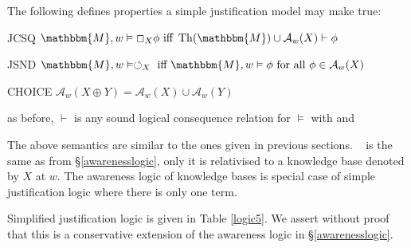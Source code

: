 \begin{definition}
  The following defines properties a simple justification model may make true:
  
  \begin{descriptiondash}
    \item[JCSQ] $\mathbbm{M}, w \vDash \Box_X \phi \text{ iff } \tmop{Th}
    (\mathbbm{M}) \cup \mathcal{A}_w (X) \vdash \phi$
    
    \item[JSND] $\mathbbm{M}, w \vDash \circlearrowleft_X \text{ iff
    $\mathbbm{M}, w \vDash \phi$ for all $\phi \in \mathcal{A}_w (X)$}$
    
    \item[CHOICE] $\mathcal{A}_w (X \oplus Y) = \mathcal{A}_w (X) \cup
    \mathcal{A}_w (Y)$
  \end{descriptiondash}
  
  as before, $\vdash$ is any sound logical consequence relation for $\vDash$
  with  and 
\end{definition}

The above semantics are similar to the ones given in previous sections. \
 is the same as  from {\S}\ref{awarenesslogic},
only it is relativised to a knowledge base denoted by $X$ at $w$.  The
awareness logic of knowledge bases is special case of simple justification
logic where there is only one term.



Simplified justification logic is given in Table \ref{logic5}.  We assert
without proof that this is a conservative extension of the awareness logic in
{\S}\ref{awarenesslogic}.



